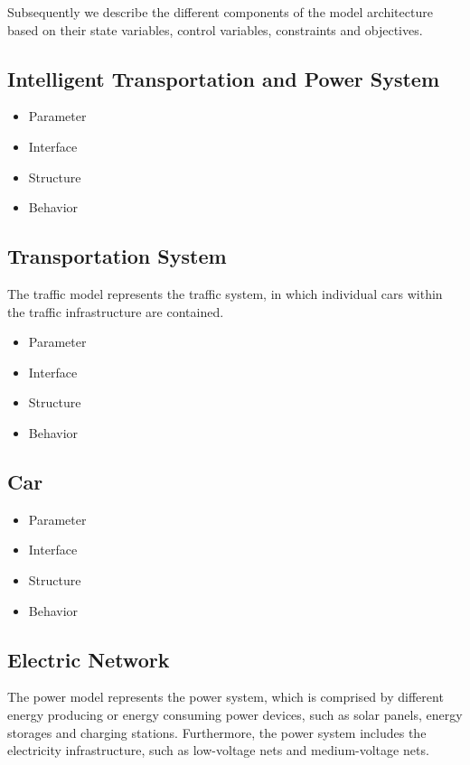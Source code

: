 Subsequently we describe the different components of the model architecture based on their state variables, control variables, constraints and objectives. 

\subsection{Intelligent Transportation and Power System}

\begin{itemize}
	\item Parameter
	\item Interface
	\item Structure
	\item Behavior
\end{itemize}

\subsection{Transportation System}

The traffic model represents the traffic system, in which individual cars within the traffic infrastructure are contained.

\begin{itemize}
	\item Parameter
	\item Interface
	\item Structure
	\item Behavior
\end{itemize}

\subsection{Car}

\begin{itemize}
	\item Parameter
	\item Interface
	\item Structure
	\item Behavior
\end{itemize}

\subsection{Electric Network}

The power model represents the power system, which is comprised by different energy producing or energy consuming power devices, such as solar panels, energy storages and charging stations. Furthermore, the power system includes the electricity infrastructure, such as low-voltage nets and medium-voltage nets.

